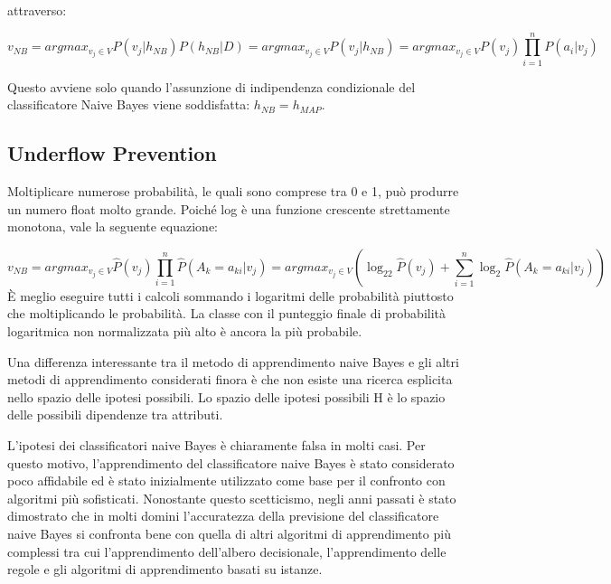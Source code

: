 \documentclass[a4paper]{extarticle}
\begin{document}
attraverso: 

\begin{equation*}
v_{NB} = argmax_{v_j \in V} P(v_j | h_{NB})P(h_{NB} | D) = argmax_{v_j \in V} P(v_j | h_{NB}) = argmax_{v_j \in V} P(v_j)  \prod_{i=1}^n P(a_i | v_j)
\end{equation*}

Questo avviene solo  quando l'assunzione di indipendenza condizionale del classificatore Naive Bayes viene soddisfatta: $h_{NB} = h_{MAP}$. 

\subsection{Underflow Prevention}
Moltiplicare numerose probabilità, le quali sono comprese tra 0 e 1, può produrre un numero float molto grande. Poiché log è una funzione crescente strettamente monotona, vale la seguente equazione:

\begin{equation*}
v_{NB} = argmax_{v_j \in V} \hat P (v_j) \prod_{i=1}^n \hat P (A_k = a_{ki} | v_j) = argmax_{v_j \in V} (\log_22 \hat P(v_j) + \sum\limits_{i=1}^n \log_2 \hat P (A_k = a_{ki} | v_j))
\end{equation*}
È meglio eseguire tutti i calcoli sommando i logaritmi delle probabilità piuttosto che moltiplicando le probabilità. La classe con il punteggio finale di probabilità logaritmica non normalizzata più alto è ancora la più probabile.

Una differenza interessante tra il metodo di apprendimento naive Bayes e gli altri metodi di apprendimento considerati finora è che non esiste una ricerca esplicita nello spazio delle ipotesi possibili. Lo spazio delle ipotesi possibili H è lo spazio delle possibili dipendenze tra attributi. 

L’ipotesi dei classificatori naive Bayes è chiaramente falsa in molti casi. Per questo motivo, l'apprendimento del classificatore naive Bayes è stato considerato poco affidabile ed è stato inizialmente utilizzato come base per il confronto con algoritmi più sofisticati. Nonostante questo scetticismo, negli anni passati è stato dimostrato che in molti domini l’accuratezza della previsione del classificatore naive Bayes si confronta bene con quella di altri algoritmi di apprendimento più complessi tra cui l’apprendimento dell’albero decisionale, l’apprendimento delle regole e gli algoritmi di apprendimento basati su istanze.
\end{document}
